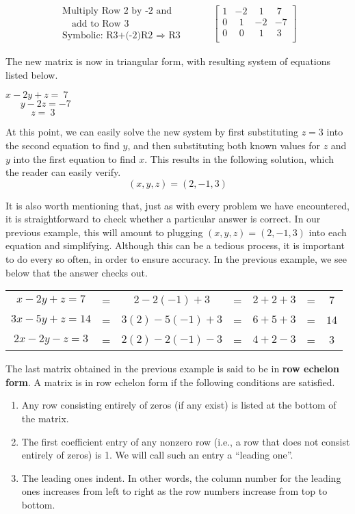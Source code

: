 \begin{example}
\begin{eqnarray*}
\begin{array}{l}
\text{Multiply Row 2 by -2 and}\\
\text{~~~add to Row 3}\\
\text{Symbolic: R3+(-2)R2~}\Rightarrow \text{~R3}
\end{array}
&&
~~~~~~\left[
\begin{array}{ccc|c}
1 & -2 & ~~1 & ~7\\
0 & ~~1 & -2 & -7\\
0 & ~~0 & ~~1 & ~3\\
\end{array}
\right]
\end{eqnarray*}

The new matrix is now in triangular form, with resulting system of equations listed below.
\begin{center}
$x-2y+z=~7$\\
$~~~~~~~y-2z=-7$\\
$~~~~~~~~~~~~z=~3$
\end{center}
At this point, we can easily solve the new system by first substituting $z=3$ into the second equation to find $y$, and then substituting both known values for $z$ and $y$ into the first equation to find $x$.  This results in the following solution, which the reader can easily verify.
$$(x,y,z)=(2,-1,3)$$
\end{example}
It is also worth mentioning that, just as with every problem we have encountered, it is straightforward to check whether a particular answer is correct.  In our previous example, this will amount to plugging $(x,y,z)=(2,-1,3)$ into each equation and simplifying.  Although this can be a tedious process, it is important to do every so often, in order to ensure accuracy.  In the previous example, we see below that the answer checks out.
\begin{center}
\begin{tabular}{ccccccc}
$x-2y+z=7$&=&$2-2(-1)+3$&=&$2+2+3$&=&$7$\\
$3x-5y+z=14$&=&$3(2)-5(-1)+3$&=&$6+5+3$&=&$14$\\
$2x-2y-z=3$&=&$2(2)-2(-1)-3$&=&$4+2-3$&=&$3$
\end{tabular}
\end{center}
The last matrix obtained in the previous example is said to be in \textbf{row echelon form}.  A matrix is in row echelon form if the following conditions are satisfied.
\begin{enumerate}
\item Any row consisting entirely of zeros (if any exist) is listed at the bottom of the matrix.
\item The first coefficient entry of any nonzero row (i.e., a row that does not consist entirely of zeros) is 1.  We will call such an entry a ``leading one''.
\item The leading ones indent.  In other words, the column number for the leading ones increases from left to right as the row numbers increase from top to bottom.
\end{enumerate}
